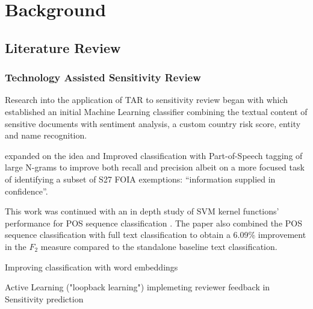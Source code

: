 \documentclass{l4proj}
\begin{document}
\chapter{Background}

\section{Literature Review}

\subsection{Technology Assisted Sensitivity Review}


Research into the application of TAR to sensitivity review began with \textcite{mcdonaldClassifierDigitalSensitivity2014} which established an initial Machine Learning classifier combining the textual content of sensitive documents with sentiment analysis, a custom country risk score, entity and name recognition.

\autocite{sanchezDetectingSensitiveInformation2012}

\textcite{mcdonaldUsingPartofSpeechNgrams2015} expanded on the idea and Improved classification with Part-of-Speech tagging of large N-grams to improve both recall and precision albeit on a more focused task of identifying a subset of S27 FOIA exemptions: ``information supplied in confidence''.

This work was continued with an in depth study of SVM kernel functions' performance for POS sequence classification \autocite{mcdonaldStudySVMKernel2017}.
The paper also combined the POS sequence classification with full text classification to obtain a 6.09\% improvement in the $F_{2}$ measure compared to the standalone baseline text classification.

\autocite{mcdonaldEnhancingSensitivityClassification2017} Improving classification with word embeddings

\autocite{mcdonaldActiveLearningStrategies2018} Active Learning ("loopback learning") implemeting reviewer feedback in Sensitivity prediction
\end{document}
